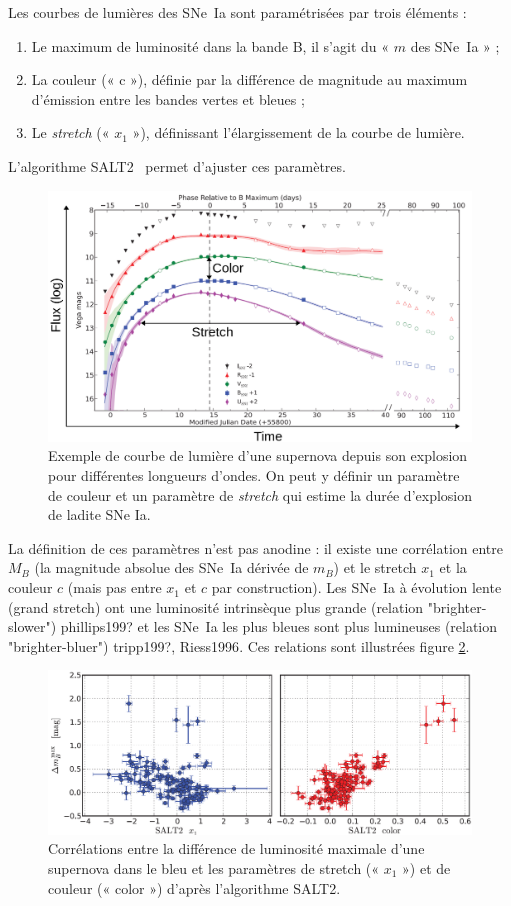 \documentclass[a4paper, 12pt, svgnames]{article}
\newcommand{\mr}[1]{{\textcolor[rgb]{0.80,0.10,0.1}{#1}}}
\begin{document}
Les courbes de lumières des SNe~Ia sont paramétrisées par trois éléments :

\begin{enumerate}
    \item Le maximum de luminosité dans la bande B, il s'agit du « $m$ des
        SNe~Ia » ;
    \item La couleur (« c »), définie par la différence de magnitude au maximum
        d'émission entre les bandes vertes et bleues ;
    \item Le \textit{stretch} (« $x_1$ »), définissant l'élargissement de la
        courbe de lumière.
\end{enumerate}

L'algorithme SALT2~\cite{guy_salt2_2007, guy_supernova_2010} permet d'ajuster
ces paramètres.

\begin{figure}[htbp!]
    \centering
    \includegraphics[width=.5\linewidth]{Rapport_figures/lightcurve.png}
    \captionsetup{justification=centering}
    \caption{Exemple de courbe de lumière d'une supernova depuis son explosion
    pour différentes longueurs d'ondes. On peut y définir un paramètre de
couleur et un paramètre de \textit{stretch} qui estime la durée d'explosion de
ladite SNe Ia.}
    \label{lightcurves}
\end{figure}

La définition de ces paramètres n'est pas anodine : il existe une corrélation
entre $M_B$ (la magnitude absolue des SNe~Ia dérivée de $m_B$) et le stretch
$x_1$ et la couleur $c$ (mais pas entre $x_1$ et $c$ par construction). Les
SNe~Ia à évolution lente (grand stretch) ont une luminosité intrinsèque plus
grande (relation "brighter-slower") \mr{phillips199?} et les SNe~Ia les plus
bleues sont plus lumineuses (relation "brighter-bluer") \mr{tripp199?,
Riess1996}. Ces relations sont illustrées figure \ref{brighter_slower_bluer}.

\begin{figure}[htbp!]
    \centering
    \includegraphics[width=.7\linewidth]{Rapport_figures/disp_x1_c.PNG}
    \captionsetup{justification=centering}
    \caption{Corrélations entre la différence de luminosité maximale d'une
    supernova dans le bleu et les paramètres de stretch (« $x_1$ ») et de
couleur (« color ») d'après l'algorithme SALT2.}
    \label{brighter_slower_bluer}
\end{figure}
\end{document}
